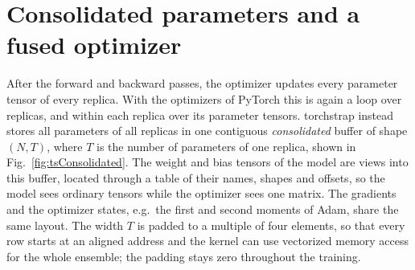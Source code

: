 \section{Consolidated parameters and a fused optimizer}
\label{sec:tsOptimizer}
After the forward and backward passes, the optimizer updates every parameter tensor of every replica.
%
With the optimizers of PyTorch this is again a loop over replicas, and within each replica over its parameter tensors.
%
torchstrap instead stores all parameters of all replicas in one contiguous \emph{consolidated} buffer of shape \((N, T)\), where \(T\) is the number of parameters of one replica, shown in Fig.~\ref{fig:tsConsolidated}.
%
The weight and bias tensors of the model are views into this buffer, located through a table of their names, shapes and offsets, so the model sees ordinary tensors while the optimizer sees one matrix.
%
The gradients and the optimizer states, e.g.\ the first and second moments of Adam, share the same layout.
%
The width \(T\) is padded to a multiple of four elements, so that every row starts at an aligned address and the kernel can use vectorized memory access for the whole ensemble; the padding stays zero throughout the training.

